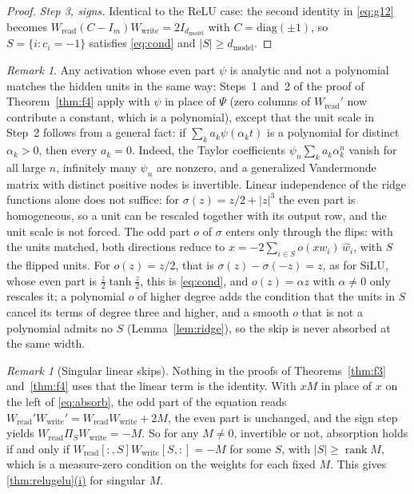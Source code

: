 \documentclass[10pt]{article}
\theoremstyle{definition}
\theoremstyle{remark}
\newtheorem{remark}[theorem]{Remark}
\newcommand{\Wread}{W_{\mathrm{read}}}
\newcommand{\Wwrite}{W_{\mathrm{write}}}
\newcommand{\dm}{d_{\mathrm{model}}}
\DeclareRobustCommand{\cpref}[2]{\hyperref[#1:#2]{\cref*{#1}(#2)}}
\begin{document}
\begin{proof}
\emph{Step 3, signs.} Identical to the ReLU case: the second identity in \eqref{eq:g12} becomes $\Wread(C - I_m)\Wwrite = 2I_{\dm}$ with $C = \mathrm{diag}(\pm1)$, so $S = \{i : c_i = -1\}$ satisfies \eqref{eq:cond} and $|S| \ge \dm$.
\end{proof}

\begin{remark}\label{rem:evenpart}
Any activation whose even part $\psi$ is analytic and not a polynomial matches the hidden units in the same way: Steps~1 and~2 of the proof of Theorem~\ref{thm:f4} apply with $\psi$ in place of $\Psi$ (zero columns of $\Wread'$ now contribute a constant, which is a polynomial), except that the unit scale in Step~2 follows from a general fact: if $\sum_k a_k\psi(\alpha_kt)$ is a polynomial for distinct $\alpha_k > 0$, then every $a_k = 0$. Indeed, the Taylor coefficients $\psi_n\sum_k a_k\alpha_k^n$ vanish for all large $n$, infinitely many $\psi_n$ are nonzero, and a generalized Vandermonde matrix with distinct positive nodes is invertible. Linear independence of the ridge functions alone does not suffice: for $\sigma(z) = z/2 + \lvert z\rvert^3$ the even part is homogeneous, so a unit can be rescaled together with its output row, and the unit scale is not forced. The odd part $o$ of $\sigma$ enters only through the flips: with the units matched, both directions reduce to $x = -2\sum_{i \in S} o(xw_i)\,\hat w_i$, with $S$ the flipped units. For $o(z) = z/2$, that is $\sigma(z) - \sigma(-z) = z$, as for SiLU, whose even part is $\tfrac z2\tanh\tfrac z2$, this is \eqref{eq:cond}, and $o(z) = \alpha z$ with $\alpha \neq 0$ only rescales it; a polynomial $o$ of higher degree adds the condition that the units in $S$ cancel its terms of degree three and higher, and a smooth $o$ that is not a polynomial admits no $S$ (Lemma~\ref{lem:ridge}), so the skip is never absorbed at the same width.
\end{remark}

\begin{remark}[Singular linear skips]\label{rem:singular}
Nothing in the proofs of Theorems~\ref{thm:f3} and~\ref{thm:f4} uses that the linear term is the identity. With $xM$ in place of $x$ on the left of \eqref{eq:absorb}, the odd part of the equation reads $\Wread'\Wwrite' = \Wread\Wwrite + 2M$, the even part is unchanged, and the sign step yields $\Wread\Pi_S\Wwrite = -M$. So for any $M \neq 0$, invertible or not, absorption holds if and only if $\Wread[{:},S]\Wwrite[S,{:}] = -M$ for some $S$, with $|S| \ge \operatorname{rank}M$, which is a measure-zero condition on the weights for each fixed $M$. This gives \cpref{thm:relugelu}{i} for singular $M$.
\end{remark}
\end{document}
